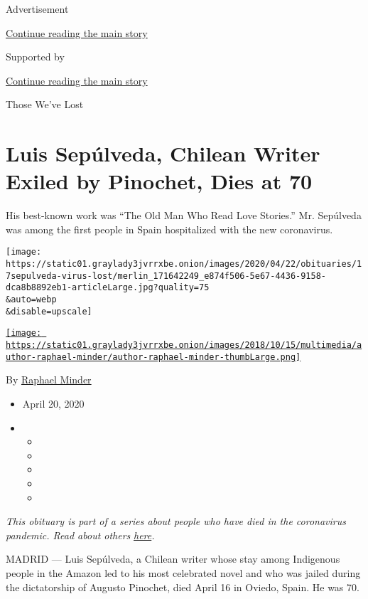 Advertisement

\protect\hyperlink{after-top}{Continue reading the main story}

Supported by

\protect\hyperlink{after-sponsor}{Continue reading the main story}

Those We've Lost

\hypertarget{luis-sepuxfalveda-chilean-writer-exiled-by-pinochet-dies-at-70}{%
\section{Luis Sepúlveda, Chilean Writer Exiled by Pinochet, Dies at
70}\label{luis-sepuxfalveda-chilean-writer-exiled-by-pinochet-dies-at-70}}

His best-known work was ``The Old Man Who Read Love Stories.'' Mr.
Sepúlveda was among the first people in Spain hospitalized with the new
coronavirus.

\texttt{[image: https://static01.graylady3jvrrxbe.onion/images/2020/04/22/obituaries/17sepulveda-virus-lost/merlin\_171642249\_e874f506-5e67-4436-9158-dca8b8892eb1-articleLarge.jpg?quality=75\\\&auto=webp\\\&disable=upscale]}

\href{https://www.nytimes3xbfgragh.onion/by/raphael-minder}{\texttt{[image: https://static01.graylady3jvrrxbe.onion/images/2018/10/15/multimedia/author-raphael-minder/author-raphael-minder-thumbLarge.png]}}

By \href{https://www.nytimes3xbfgragh.onion/by/raphael-minder}{Raphael
Minder}

\begin{itemize}
\item
  April 20, 2020
\item
  \begin{itemize}
  \item
  \item
  \item
  \item
  \item
  \end{itemize}
\end{itemize}

\emph{This obituary is part of a series about people who have died in
the coronavirus pandemic. Read about others}
\href{https://www.nytimes3xbfgragh.onion/series/people-who-have-died-of-the-coronavirus}{\emph{here}}\emph{.}

MADRID --- Luis Sepúlveda, a Chilean writer whose stay among Indigenous
people in the Amazon led to his most celebrated novel and who was jailed
during the dictatorship of Augusto Pinochet, died April 16 in Oviedo,
Spain. He was 70.

